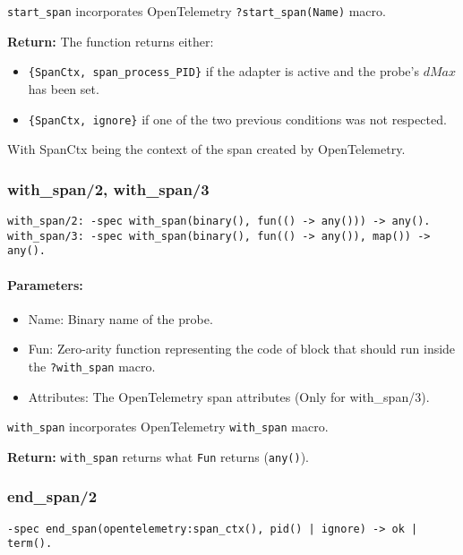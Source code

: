         \texttt{start\_span} incorporates OpenTelemetry \texttt{?start\_span(Name)} macro.
        
        \textbf{Return:} 
        The function returns either:
        \begin{itemize}
            \item  \texttt{\{SpanCtx, span\_process\_PID\}} if the adapter is active and the probe's $dMax$ has been set.
            \item \texttt{\{SpanCtx, ignore\}} if one of the two previous conditions was not respected.
        \end{itemize}
        With SpanCtx being the context of the span created by OpenTelemetry.
        
        \subsubsection{with\_span/2, with\_span/3}
        
        \begin{verbatim}
with_span/2: -spec with_span(binary(), fun(() -> any())) -> any().
with_span/3: -spec with_span(binary(), fun(() -> any()), map()) -> any().
        \end{verbatim}
         
        \paragraph{Parameters:}
            \begin{itemize}
                \item Name: Binary name of the probe.
                \item Fun: Zero-arity function representing the code of block that should run inside the \texttt{?with\_span} macro.
                \item Attributes: The OpenTelemetry span attributes (Only for with\_span/3).

            \end{itemize}

        \texttt{with\_span} incorporates OpenTelemetry \texttt{with\_span} macro.

        \textbf{Return:}
            \texttt{with\_span} returns what \texttt{Fun} returns (\texttt{any()}).
        
        \subsubsection{end\_span/2}
            \begin{verbatim}                
-spec end_span(opentelemetry:span_ctx(), pid() | ignore) -> ok | term().
            \end{verbatim}
